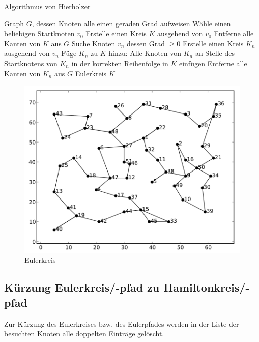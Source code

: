 \documentclass[11pt,a4paper]{article}
\begin{document}
\begin{algorithm}[H]
    \renewcommand{\algorithmicrequire}{\textbf{Eingabe:}}
    \renewcommand{\algorithmicensure}{\textbf{Ausgabe:}}
    \caption{Algorithmus von Hierholzer}

    \begin{algorithmic}[1]
    \REQUIRE Graph $G$, dessen Knoten alle einen geraden Grad aufweisen
        \STATE Wähle einen beliebigen Startknoten $v_0$
        \STATE Erstelle einen Kreis $K$ ausgehend von $v_0$
        \STATE Entferne alle Kanten von $K$ aus $G$
            \STATE Suche Knoten $v_n$ dessen Grad $\ge 0$
            \STATE Erstelle einen Kreis $K_n$ ausgehend von $v_n$
            \STATE Füge $K_n$ zu $K$ hinzu: Alle Knoten von $K_n$ an Stelle des Startknotens von $K_n$ in der korrekten Reihenfolge in $K$ einfügen
            \STATE Entferne alle Kanten von $K_n$ aus $G$
        \ENDWHILE
    \ENSURE Eulerkreis $K$
    \end{algorithmic}
\end{algorithm}

\begin{figure}[H]
        \centering
        \includegraphics[width=11.5cm]{gfx/eil51_euler}
        \caption{Eulerkreis}
        \label{img:eil51_euler}
\end{figure}

\newpage

\subsection{Kürzung Eulerkreis/-pfad zu Hamiltonkreis/-pfad}
Zur Kürzung des Eulerkreises bzw. des Eulerpfades werden in der Liste der besuchten Knoten alle doppelten Einträge gelöscht.
\end{document}

